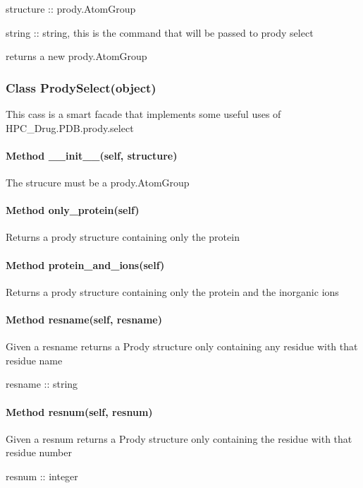         structure :: prody.AtomGroup

        string :: string, this is the command that will be passed to prody select

        returns a new prody.AtomGroup

    \subsubsection{Class ProdySelect(object)}
    
        This cass is a smart facade that implements some useful
        uses of HPC\_Drug.PDB.prody.select

        \paragraph{Method \_\_init\_\_(self, structure)}

            The strucure must be a prody.AtomGroup

        \paragraph{Method only\_protein(self)}
        
            Returns a prody structure containing only the protein
        

        \paragraph{Method protein\_and\_ions(self)}
        
            Returns a prody structure containing only the protein and the inorganic ions

        \paragraph{Method resname(self, resname)}
        
            Given a resname returns a Prody structure only containing any residue with
            that residue name

            resname :: string

        \paragraph{Method resnum(self, resnum)}

            Given a resnum returns a Prody structure only containing the residue with
            that residue number

            resnum :: integer